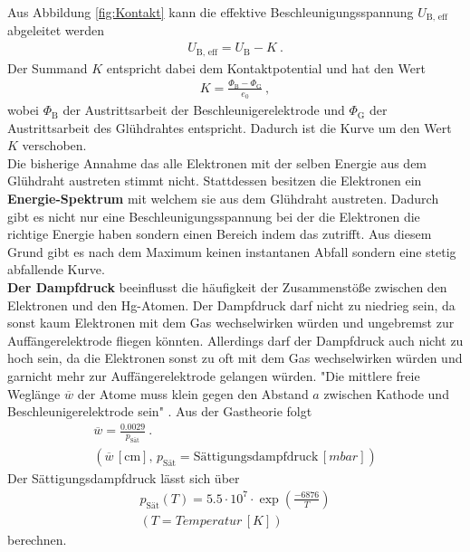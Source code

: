 Aus Abbildung \eqref{fig:Kontakt} kann die effektive Beschleunigungsspannung $U_\text{B, eff}$ abgeleitet werden
\begin{align*}
	U_\text{B, eff} = U_\text{B} - K \ .
\end{align*}
Der Summand $K$ entspricht dabei dem Kontaktpotential und hat den Wert
\begin{align*}
	K = \frac{\Phi_\text{B} - \Phi_\text{G}}{e_0} \ ,
\end{align*}
wobei $\Phi_\text{B}$ der Austrittsarbeit der Beschleunigerelektrode und $\Phi_\text{G}$ der Austrittsarbeit des Glühdrahtes entspricht. Dadurch ist die Kurve um den Wert $K$ verschoben. \\
Die bisherige Annahme das alle Elektronen mit der selben Energie aus dem Glühdraht austreten stimmt nicht. Stattdessen besitzen die Elektronen ein \textbf{Energie-Spektrum} mit welchem sie aus dem Glühdraht austreten. Dadurch gibt es nicht nur eine Beschleunigungsspannung bei der die Elektronen die richtige Energie haben sondern einen Bereich indem das zutrifft. Aus diesem Grund gibt es nach dem Maximum keinen instantanen Abfall sondern eine stetig abfallende Kurve. \\
\textbf{Der Dampfdruck} beeinflusst die häufigkeit der Zusammenstöße zwischen den Elektronen und den Hg-Atomen. Der Dampfdruck darf nicht zu niedrieg sein, da sonst kaum Elektronen mit dem Gas wechselwirken würden und ungebremst zur Auffängerelektrode fliegen könnten. Allerdings darf der Dampfdruck auch nicht zu hoch sein, da die Elektronen sonst zu oft mit dem Gas wechselwirken würden und garnicht mehr zur Auffängerelektrode gelangen würden. "Die mittlere freie Weglänge $\overline{w}$ der Atome muss klein gegen den Abstand $a$ zwischen Kathode und Beschleunigerelektrode sein" \cite[6]{sample}. Aus der Gastheorie folgt
\begin{align*}
	\overline{w} = \frac{0.0029}{p_\text{Sät}} \ . \\
	(\overline{w}\, [\text{cm}],\, p_\text{Sät} = \text{Sättigungsdampfdruck}\, [mbar])
\end{align*}
Der Sättigungsdampfdruck lässt sich über
\begin{align*}
	p_\text{Sät}(T) = 5.5 \cdot 10^7 \cdot \exp(\frac{-6876}{T}) \\
	(T = Temperatur\, [K])
\end{align*}
berechnen.

























